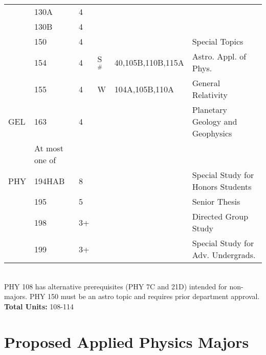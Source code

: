 \documentclass[12pt]{article}
\begin{document}
\begin{tabular}{|llllll|}
    & 130A & 4 &  &  & \\  
    & 130B & 4 &  &  & \\  
    & 150  & 4 &  &  & Special Topics\\  
    & 154  & 4 & S$^\#$ & 40,105B,110B,115A & Astro. Appl. of Phys. \\
    & 155  & 4 & W   & 104A,105B,110A & General Relativity \\ 
GEL & 163  & 4 &  &  & Planetary Geology and Geophysics\\ 
 & At most one of &  &  &  & \\ 
PHY & 194HAB & 8 &  &  & Special Study for Honors Students\\ 
    & 195  & 5 &  &  & Senior Thesis\\
    & 198  & 3+ &  &  & Directed Group Study\\ 
    & 199  & 3+ &  &  & Special Study for Adv. Undergrads.\\ 
\hline
\end{tabular}\\
\vskip 0.25cm
\noindent
PHY 108 has alternative prerequisites (PHY 7C and 21D)
intended for non-majors.  PHY 150 must be an astro topic and requires
prior department approval.\\
\noindent
{\bf Total Units:} 108-114 \\


\newpage
\section{Proposed Applied Physics Majors}
\end{document}
